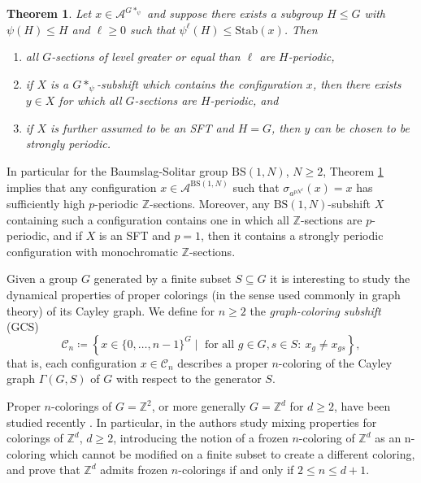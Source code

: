 \documentclass[letterpaper,11pt,reqno]{amsart}
\theoremstyle{plain}
\newtheorem{theorem}{Theorem}[section]
\theoremstyle{definition}
\theoremstyle{cupremark}
\newcommand{\BS}[1][N]{\mathrm{BS}(1,#1)}
\begin{document}
\begin{theorem}\label{thm:summary_weak_periodicity}
	Let $x\in \mathcal{A}^{G*_{\psi}}$ and suppose there exists a subgroup $H\leqslant G$ with $\psi(H)\leqslant H$ and $\ell\ge 0$ such that $\psi^{\ell}(H)\leqslant \mathrm{Stab}(x)$. Then
	\begin{enumerate}
		\item all $G$-sections of level greater or equal than $\ell$ are $H$-periodic,
		\item if $X$ is a $G*_{\psi}$-subshift which contains the configuration $x$, then there exists $y\in X$ for which all $G$-sections are $H$-periodic, and 
		\item if $X$ is further assumed to be an SFT and $H=G$, then $y$ can be chosen to be strongly periodic.
	\end{enumerate}
\end{theorem}

In particular for the Baumslag-Solitar group $\BS$, $N\ge 2$, Theorem \ref{thm:summary_weak_periodicity} implies that any configuration $x\in \mathcal{A}^{\BS}$ such that $\sigma_{a^{pN^\ell}}(x)=x$ has sufficiently high $p$-periodic $\mathbb{Z}$-sections. Moreover, any $\BS$-subshift $X$ containing such a configuration contains one in which all $\mathbb{Z}$-sections are $p$-periodic, and if $X$ is an SFT and $p=1$, then it contains a strongly periodic configuration with monochromatic $\mathbb{Z}$-sections.


Given a group $G$ generated by a finite subset $S\subseteq G$ it is interesting to study the dynamical properties of proper colorings (in the sense used commonly in graph theory) of its Cayley graph. We define for $n\ge 2$ the \textit{graph-coloring subshift} (GCS)
$$
\mathcal{C}_{n}\coloneqq\left\{x\in \{0,\ldots,n-1\}^G\mid \text{ for all } g\in G, s\in S: \ x_{g}\neq x_{gs} \right\},
$$
that is, each configuration $x\in \mathcal{C}_{n}$ describes a proper $n$-coloring of the Cayley graph $\Gamma(G,S)$ of $G$ with respect to the generator $S$. 

Proper $n$-colorings of $G=\mathbb{Z}^2$, or more generally $G=\mathbb{Z}^d$ for $d\ge 2$, have been studied recently \cite{alon2019mixing, peled2018rigidity, ray2020proper}. In particular, in \cite{alon2019mixing} the authors study mixing properties for colorings of $\mathbb{Z}^d$, $d\ge 2$, introducing the notion of a frozen $n$-coloring of $\mathbb{Z}^d$ as an n-coloring which cannot be modified on a finite subset to create a different coloring, and prove that $\mathbb{Z}^d$ admits frozen $n$-colorings if and only if $2\le n\le d+1$. 
\end{document}
